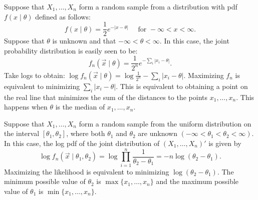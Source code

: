 \begin{example}
Suppose that $X_1, \ldots, X_n$ form a random sample from a distribution with 
pdf $f(x \mid \theta)$ defined as follows:
\[
    f(x \mid \theta) = \frac{1}{2} e^{- |x - \theta|} 
        \quad \text{ for } -\infty < x < \infty.
\]
Suppose that $\theta$ is unknown and that $-\infty < \theta < \infty$. 
In this case, the joint probability distribution is easily seen to be:
\[
    f_n(\vec{x} \mid \theta) = \frac{1}{2^n} e^{- \sum_i |x_i - \theta|}.
\]
Take logs to obtain: 
$\log f_n (\vec{x} \mid \theta) = \log \frac{1}{2^n} - \sum_i |x_i - \theta|$. 
Maximizing $f_n$ is equivalent to minimizing $\sum_i |x_i - \theta|$. This 
is equivalent to obtaining a point on the real line that minimizes the sum 
of the distances to the points $x_1, \ldots, x_n$. This happens when $\theta$
is the median of $x_1, \ldots, x_n$.
\eop 
\end{example}

\begin{example}\label{ex:stats:uniform}
Suppose that $X_1, \ldots, X_n$ form a random sample from the uniform distribution
on the interval $[\theta_1, \theta_2]$, where both $\theta_1$ and $\theta_2$ 
are unknown $(-\infty < \theta_1 < \theta_2 < \infty)$. In this case, the 
log pdf of the joint distribution of $(X_1, \ldots, X_n)'$ is given by
\[
    \log f_n (\vec{x} \mid \theta_1, \theta_2) 
    = \log \prod_{i = 1}^n \frac{1}{\theta_2 - \theta_1}    
    = - n \log (\theta_2 - \theta_1).
\]
Maximizing the likelihood is equivalent to minimizing $\log (\theta_2 - \theta_1)$.
The minimum possible value of $\theta_2$ is $\max \{x_1, \ldots, x_n\}$
and the maximum possible value of $\theta_1$ is $\min \{x_1, \ldots, x_n\}$.
\eop 
\end{example}

